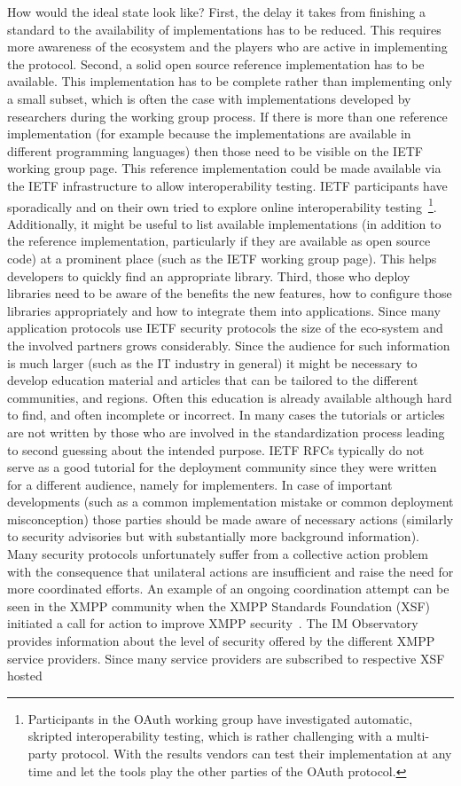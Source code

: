 \documentclass[peerreview, a4paper, 7pt]{IEEEtran}
\begin{document}
How would the ideal state look like? First, the delay it takes from finishing a standard to the availability of implementations has to be reduced. This requires more awareness of the ecosystem and the players who are active in implementing the protocol. Second, a solid open source reference implementation has to be available. This implementation has to be complete rather than implementing only a small subset, which is often the case with implementations developed by researchers during the working group process. If there is more than one reference implementation (for example because the implementations are available in different programming languages) then those need to be visible on the IETF working group page. This reference implementation could be made available via the IETF infrastructure to allow interoperability testing. IETF participants have sporadically and on their own tried to explore online interoperability testing~\footnote{Participants in the OAuth working group have investigated automatic, skripted interoperability testing, which is rather challenging with a multi-party protocol. With the results vendors can test their implementation at any time and let the tools play the other parties of the OAuth protocol.}. Additionally, it might be useful to list available implementations (in addition to the reference implementation, particularly if they are available as open source code) at a prominent place (such as the IETF working group page). This helps developers to quickly find an appropriate library. Third, those who deploy libraries need to be aware of the benefits the new features, how to configure those libraries appropriately and how to integrate them into applications. Since many application protocols use IETF security protocols the size of the eco-system and the involved partners grows considerably. Since the audience for such information is much larger (such as the IT industry in general) it might be necessary to develop education material and articles that can be tailored to the different communities, and regions. Often this education is already available although hard to find, and often incomplete or incorrect. In many cases the tutorials or articles are not written by those who are involved in the standardization process leading to second guessing about the intended purpose. IETF RFCs typically do not serve as a good tutorial for the deployment community since they were written for a different audience, namely for implementers. In case of important developments (such as a common implementation mistake or common deployment misconception) those parties should be made aware of necessary actions (similarly to security advisories but with substantially more background information). Many security protocols unfortunately suffer from a collective action problem with the consequence that unilateral actions are insufficient and raise the need for more coordinated efforts. An example of an ongoing coordination attempt can be seen in the XMPP community when the XMPP Standards Foundation (XSF) initiated a call for action to improve XMPP security~\cite{manifesto}. The IM Observatory~\cite{IM-Observatory} provides information about the level of security offered by the different XMPP service providers. Since many service providers are subscribed to respective XSF hosted 
\end{document}
